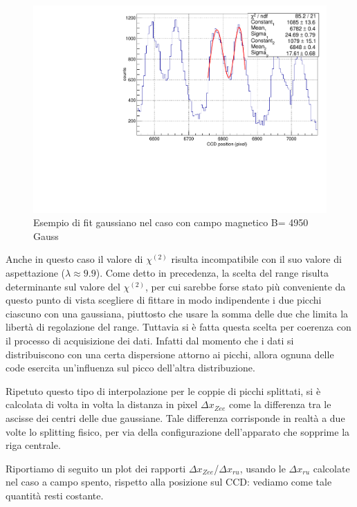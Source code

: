 \documentclass{article}
\begin{document}
	\begin{center}
		\begin{figure}[H]
			\centering
			\includegraphics[scale=0.38, angle=0]{campomax/singolo.pdf}
			\setlength{\belowcaptionskip}{-20pt}
			\caption{ Esempio di fit gaussiano nel caso con campo magnetico B= 4950 Gauss}
			\label{fig:singoloBonMax}
		\end{figure}
	\end{center}

	Anche in questo caso il valore di $\chi^{(2)}$ risulta incompatibile con il suo
	valore di aspettazione ($\lambda \approx 9.9$). Come detto in precedenza, la scelta
	del range risulta determinante sul valore del $\chi^{(2)}$, per cui sarebbe forse
	stato più conveniente da questo punto di vista scegliere di fittare in modo indipendente
	i due picchi ciascuno con una gaussiana, piuttosto che usare la somma delle due che 
	limita la libertà di regolazione del range. Tuttavia si è fatta questa scelta per coerenza
	con il processo di acquisizione dei dati. Infatti dal momento che i dati si distribuiscono
	con una certa dispersione attorno ai picchi, allora ognuna delle code esercita un'influenza
	sul picco dell'altra distribuzione.


	Ripetuto questo tipo di interpolazione per le coppie di picchi splittati, si è calcolata di volta 
	in volta la distanza in pixel $\Delta x_{Zee}$ come la differenza tra le ascisse dei centri delle due
	gaussiane. Tale differenza corrisponde in realtà a due volte lo splitting fisico, per via della 
	configurazione dell'apparato che sopprime la riga centrale.

	Riportiamo di seguito un plot dei rapporti $\Delta x_{Zee}$/$\Delta x_{ru}$, usando le $\Delta x_{ru}$
	calcolate nel caso a campo spento, rispetto alla posizione sul CCD: vediamo come tale quantità resti 
	costante.
\end{document}
